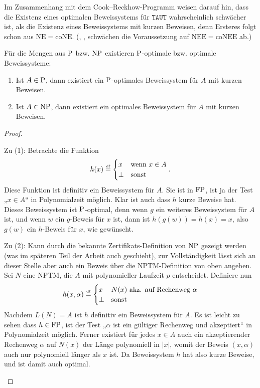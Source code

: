 Im Zusammenhang mit dem Cook–Reckhow-Programm weisen \textcite{krajicek_propositional_1989} darauf hin, dass die Existenz eines optimalen Beweissystems für $\mathtt{TAUT}$ wahrscheinlich schwächer ist, als die Existenz eines Beweissystems mit kurzen Beweisen, denn Ersteres folgt schon aus $\mathrm{NE}=\mathrm{coNE}$. (\citeauthor{kobler_optimal_2003}, \citeyear{kobler_optimal_2003}, schwächen die Voraussetzung auf $\mathrm{NEE=coNEE}$ ab.)

Für die Mengen aus $\P$ bzw. $\NP$ existieren $\P$-optimale bzw. optimale Beweissysteme:
\begin{observation}\label{obs:np-short-ps}
    \begin{enumerate}
        \item Ist $A\in \P$, dann existiert ein $\P$-optimales Beweissystem für $A$ mit kurzen Beweisen.
        \item Ist $A\in \NP$, dann existiert ein optimales Beweissystem für $A$ mit kurzen Beweisen.
    \end{enumerate}
\end{observation}
\begin{proof}
\begin{prooflist}
\item Zu (1): Betrachte die Funktion
    \[ h(x) \defeq \begin{cases} x & \text{wenn $x\in A$} \\ \bot & \text{sonst} \end{cases}. \]
    Diese Funktion ist definitiv ein Beweissystem für $A$. Sie ist in $\FP$, ist ja der Test „$x\in A$“ in Polynomialzeit möglich. Klar ist auch dass $h$ kurze Beweise hat. Dieses Beweissystem ist $\P$-optimal, denn wenn $g$ ein weiteres Beweissystem für $A$ ist, und wenn $w$ ein $g$-Beweis für $x$ ist, dann ist $h(g(w))=h(x)=x$, also $g(w)$ ein $h$-Beweis für $x$, wie gewünscht. 

\item Zu (2): Kann durch die bekannte Zertifikats-Definition von $\NP$ gezeigt werden (was im späteren Teil der Arbeit auch geschieht), zur Vollständigkeit lässt sich an dieser Stelle aber auch ein Beweis über die NPTM-Definition von oben angeben. Sei $N$ eine NPTM, die $A$ mit polynomieller Laufzeit $p$ entscheidet.
    Definiere nun
    \[ h(x, \alpha) \defeq \begin{cases} x & \text{$N(x)$ akz. auf Rechenweg $\alpha$} \\ \bot & \text{sonst} \end{cases} \]
    Nachdem $L(N)=A$ ist $h$ definitiv ein Beweissystem für $A$. Es ist leicht zu sehen dass $h\in\FP$, ist der Test „$\alpha$ ist ein gültiger Rechenweg und akzeptiert“ in Polynomialzeit möglich. Ferner existiert für jedes $x\in A$ auch ein akzeptierender Rechenweg $\alpha$ auf $N(x)$ der Länge polynomiell in $|x|$, womit der Beweis $(x, \alpha)$ auch nur polynomiell länger als $x$ ist. Da Beweissystem $h$ hat also kurze Beweise, und ist damit auch optimal.
\end{prooflist}
\end{proof}
